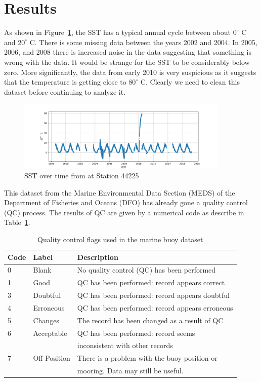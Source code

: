 \documentclass[12pt, letterpaper]{article}
\begin{document}
\section{Results}

As shown in Figure~\ref{fig:sst_timeseries}, the SST has a typical annual cycle between about $0^\circ$ C and $20^\circ$ C. There is some missing data between the years 2002 and 2004.  In 2005, 2006, and 2008 there is
increased noise in the data suggesting that something is wrong with the data.  It would be strange for the SST to be considerably below zero.  More significantly, the data from early 2010 is very suspicious as it suggests that the temperature is getting close to $80^\circ$ C.  Clearly we need to clean this dataset before continuing to analyze it.

\begin{figure}
\includegraphics[width=0.9\textwidth]{sst_timeseries}
\caption{SST over time from at Station 44225}
\label{fig:sst_timeseries}
\end{figure}

This dataset from the Marine Environmental Data Section (MEDS) of the Department of Fisheries and Oceans (DFO) has already gone a quality control (QC) process. The results of QC are given by a numerical code as describe in Table~\ref{tbl:qc_codes}.

\begin{table}[h]
\begin{tabular}{|l|l|l|}
\hline
Code & Label & Description \\
\hline
0 & Blank & No quality control (QC) has been performed \\
1 & Good & QC has been performed: record appears correct \\
3 & Doubtful &  QC has been performed: record appears doubtful \\
4 & Erroneous & QC has been performed: record appears erroneous \\
5 & Changes & The record has been changed as a result of QC \\
6 & Acceptable & QC has been performed: record seems \\  & & inconsistent with other records \\
7 & Off Position & There is a problem with the buoy position or \\ & & mooring. Data may still be useful. \\
\hline
\end{tabular}
\caption{Quality control flags used in the marine buoy dataset}
\label{tbl:qc_codes}
\end{table}
\end{document}
